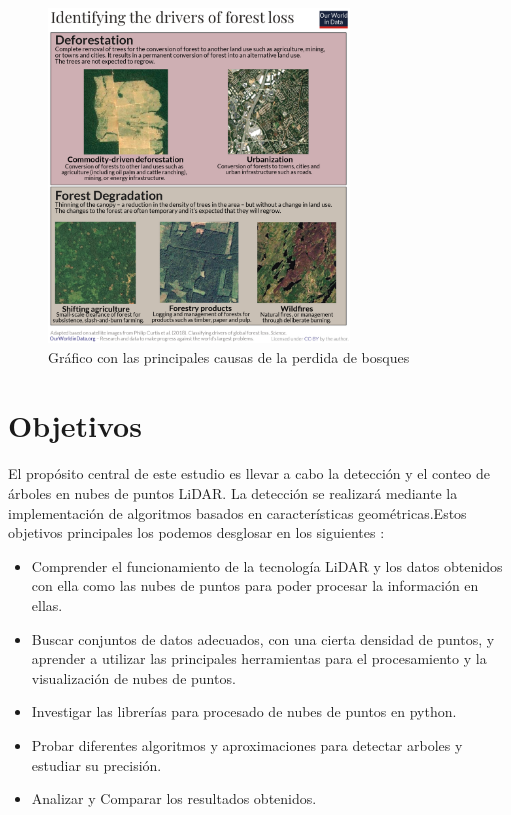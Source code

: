 \begin{figure}[h]
\centering
\includegraphics[width=8cm]{imaxes/Identifying-drivers-of-forest-loss.png}
\caption{Gráfico con las principales causas de la perdida de bosques}
\label{fig:drivers of forest lost}
\end{figure}

\section{Objetivos}
\label{sec:Objetivos}

El propósito central de este estudio es llevar a cabo la detección y el conteo de árboles en nubes de puntos LiDAR. La detección se realizará mediante la implementación de algoritmos basados en características geométricas.Estos objetivos principales los podemos desglosar en los siguientes :

\begin{itemize}
    \item Comprender el funcionamiento de la tecnología LiDAR y los datos obtenidos con ella como las nubes de puntos para poder procesar la información en ellas.
    \item Buscar conjuntos de datos adecuados, con una cierta densidad de puntos, y aprender a utilizar las principales herramientas para el procesamiento y la visualización de nubes de puntos.
    \item Investigar las librerías para procesado de nubes de puntos en python.
    \item Probar diferentes algoritmos y aproximaciones para detectar arboles y estudiar su precisión.
    \item Analizar y Comparar los resultados obtenidos.
\end{itemize}


